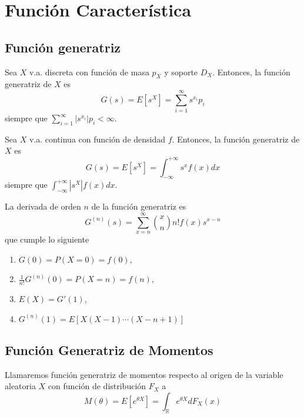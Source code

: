 \chapter{Función Característica}

\section{Función generatriz}

\begin{defn}
  Sea $X$ v.a. discreta con función de masa $p_{X}$ y soporte $D_{X}$. Entonces, la función generatriz de $X$ es 
  \[ 
    G(s) = E [ s^{X} ] = \sum_{i = 1}^{\infty} s^{x_{i}} p_{i}
  \] 
  siempre que $\sum_{i = 1}^{\infty} |s^{x_{i}}| p_{i} < \infty$.
\end{defn}

\begin{defn}
  Sea $X$ v.a. continua con función de densidad $f$. Entonces, la función generatriz de $X$ es
  \[ 
    G(s) = E [s^{X}] = \int_{- \infty}^{+ \infty} s^{x}f(x) dx
  \] 
  siempre que $\int_{- \infty}^{+ \infty} |s^{X}|f(x) dx$.
\end{defn}

\begin{prop}
  La derivada de orden $n$ de la función generatriz es
  \[ 
    G^{(n)}(s) = \sum_{x = n}^{\infty} \binom{x}{n} n! f(x) s^{x - n}
  \] 
  que cumple lo siguiente
  \begin{enumerate}[label=(\roman*)]
    \item $G(0) = P(X = 0) = f(0)$,
    \item $\frac{1}{n!}G^{(n)}(0) = P(X = n) = f(n)$,
    \item $E(X) = G'(1)$,
    \item $G^{(n)}(1) = E [ X(X - 1) \cdots (X - n + 1) ]$
  \end{enumerate}
\end{prop}

\section{Función Generatriz de Momentos}

\begin{defn}
  Llamaremos función generatriz de momentos respecto al origen de la variable aleatoria $X$ con función de distribución $F_{X}$ a
  \[ 
    M(\theta) = E [e ^{\theta X}] = \int_{\mathbb{R}}^{} e ^{\theta X} dF_{X}(x)
  \] 
\end{defn}

